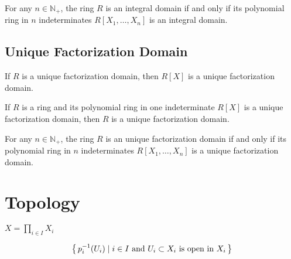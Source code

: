 \begin{corollary}
    For any \(n \in \mathbb{N}_+\), the ring \(R\) is an integral domain if and only if its polynomial ring in \(n\) indeterminates \(R[X_1, \ldots, X_n]\) is an integral domain.
\end{corollary}

\newpage
\chapter{Unique Factorization Domain}

\begin{proposition}
    If \(R\) is a unique factorization domain, then \(R[X]\) is a unique factorization domain.
\end{proposition}

\begin{proposition}
    If \(R\) is a ring and its polynomial ring in one indeterminate \(R[X]\) is a unique factorization domain, then \(R\) is a unique factorization domain.
\end{proposition}

\begin{corollary}
    For any \(n \in \mathbb{N}_+\), the ring \(R\) is an unique factorization domain if and only if its polynomial ring in \(n\) indeterminates \(R[X_1, \ldots, X_n]\) is a unique factorization domain.
\end{corollary}
\part{Topology}

\begin{defbox}
    \begin{definition}
        \label{def:product_topology}
        \(X = \prod_{i \in I} X_i\)

        \begin{align*}
            \left\{\, p_{i}^{-1}(U_i) \mathrel{\mid} i \in I \text{ and } U_i \subset X_i \text{ is open in }X_i \,\right\}
        \end{align*}
    \end{definition}
\end{defbox}